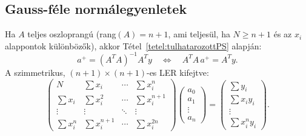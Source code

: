 \documentclass[a4paper,12pt]{article}
\theoremstyle{mydef}
\begin{document}
\subsection*{Gauss-féle normálegyenletek}

Ha $A$ teljes oszloprangú (rang$(A)=n+1$, ami teljesül, ha $N\ge n+1$ és az $x_i$ alappontok különbözők),
akkor Tétel~\ref{tetel:tulhatarozottPS} alapján:
\[
  a^+ = (A^T A)^{-1} A^T y \quad \Longleftrightarrow \quad A^T A\,a^+ = A^T y.
\]
A szimmetrikus, $(n+1)\times(n+1)$-es LER kifejtve:
\[
  \begin{pmatrix}
    N & \sum x_i & \cdots & \sum x_i^n \\
    \sum x_i & \sum x_i^2 & \cdots & \sum x_i^{n+1} \\
    \vdots & \vdots & \ddots & \vdots \\
    \sum x_i^n & \sum x_i^{n+1} & \cdots & \sum x_i^{2n}
  \end{pmatrix}
  \begin{pmatrix} a_0 \\ a_1 \\ \vdots \\ a_n \end{pmatrix}
  =
  \begin{pmatrix} \sum y_i \\ \sum x_i y_i \\ \vdots \\ \sum x_i^n y_i \end{pmatrix}.
\]
\end{document}
